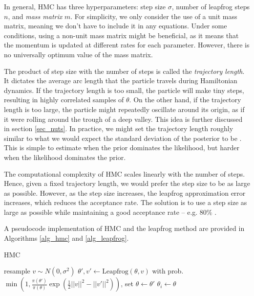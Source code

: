 \documentclass[12pt]{article}
\begin{document}
In general, HMC has three hyperparameters: step size $\sigma$, number of leapfrog steps $n$, and \textit{mass matrix} $m$. For simplicity, we only consider the use of a unit mass matrix, meaning we don't have to include it in any equations. Under some conditions, using a non-unit mass matrix might be beneficial, as it means that the momentum is updated at different rates for each parameter. However, there is no universally optimum value of the mass matrix.

The product of step size with the number of steps is called the \textit{trajectory length}. It dictates the average arc length that the particle travels during Hamiltonian dynamics. If the trajectory length is too small, the particle will make tiny steps, resulting in highly correlated samples of $\theta$. On the other hand, if the trajectory length is too large, the particle might repeatedly oscillate around its origin, as if it were rolling around the trough of a deep valley. This idea is further discussed in section \ref{sec_nuts}. In practice, we might set the trajectory length roughly similar to what we would expect the standard deviation of the posterior to be \cite{bnn_posterior}. This is simple to estimate when the prior dominates the likelihood, but harder when the likelihood dominates the prior.

The computational complexity of HMC scales linearly with the number of steps. Hence, given a fixed trajectory length, we would prefer the step size to be as large as possible. However, as the step size increases, the leapfrog approximation error increases, which reduces the acceptance rate. The solution is to use a step size as large as possible while maintaining a good acceptance rate -- e.g. $80\%$ \cite{bnn_posterior}.


A pseudocode implementation of HMC and the leapfrog method are provided in Algorithms \ref{alg_hmc} and \ref{alg_leapfrog}.

\begin{algorithm}
\caption{HMC}
\label{alg_hmc}
\begin{algorithmic}
 
	\State resample $v \sim N(0, \sigma^2)$ 
	\State $\theta', v' \gets \textrm{Leapfrog}(\theta, v)$ 
	\State with prob. $\min{\left(1, \frac{\pi(\theta')}{\pi(\theta)} \exp \left( \frac{1}{2}||v||^2 - ||v'||^2 \right) \right)}$, set $\theta \gets \theta'$ 
	\State $\theta_i \gets \theta$ 
\EndFor
\end{algorithmic}
\end{algorithm}
\end{document}
